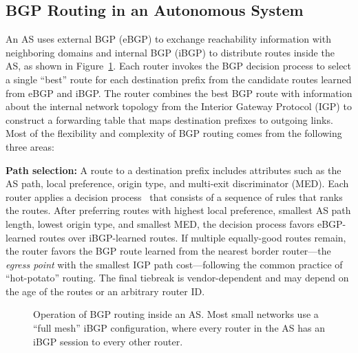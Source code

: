 \subsection{BGP Routing in an Autonomous System}
\label{sec:backg}
An AS uses external BGP (eBGP) to exchange reachability information
with neighboring domains and internal BGP (iBGP) to distribute routes
inside the AS, as shown in Figure~\ref{fig:today}.  Each router
invokes the BGP decision process to select a single ``best'' route for
each destination prefix from the candidate routes learned from eBGP and iBGP.
The router combines the best BGP route with information about the
internal network topology from the Interior Gateway Protocol
(IGP) to construct a forwarding table that maps
destination prefixes to outgoing links.  Most of the flexibility and
complexity of BGP routing comes from the following three areas:

\textbf{Path selection:} A route to a destination prefix
includes attributes such as the AS path, local preference, origin
type, and multi-exit discriminator (MED).  Each router applies a
decision process~\cite{id-bgp4} that consists of a sequence of rules
that ranks the routes.  After preferring routes with highest local
preference, smallest AS path length, lowest origin type, and smallest
MED, the decision process favors eBGP-learned routes over iBGP-learned
routes.  If multiple equally-good routes remain, the router favors the
BGP route learned from the nearest border router---the {\em egress
point\/} with the smallest IGP path cost---following the common
practice of ``hot-potato'' routing.  The final tiebreak is
vendor-dependent and may depend on the age of the routes or an
arbitrary router ID.


\begin{figure}
\centering{}
\caption[Operation of BGP routing inside an AS.]{Operation of BGP
routing inside an AS.  Most small networks use a 
``full mesh'' iBGP configuration, where every router in the AS has an
  iBGP session to every other router.} 
\label{fig:today}
\end{figure}

